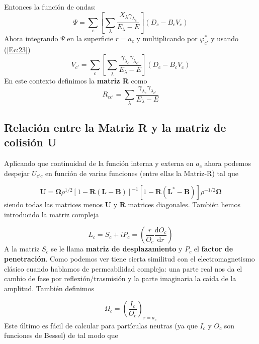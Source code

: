 \documentclass[fleqn,10pt]{SelfArx} %
\newcommand{\parentesis}[1]{\left( #1  \right)}
\newcommand{\ccorchetes}[1]{\left[ #1  \right]}
\newcommand{\D}{\mathrm{d}}
\newcommand{\derivadas}[2]{\frac{\D #1}{\D #2}}
\newcommand{\Rn}{\mathbf{R}}
\newcommand{\Ln}{\mathbf{L}}
\newcommand{\Un}{\mathbf{U}}
\newcommand{\Bn}{\mathbf{B}}
\newcommand{\Omegan}{\boldsymbol{\Omega}}
\begin{document}
Entonces la función de ondas:
\begin{equation}
	\Psi = \sum_c \ccorchetes{\sum_\lambda \frac{X_\lambda \gamma_{\lambda_c}}{E_\lambda - E}} (D_c - B_c V_c)
\end{equation}
Ahora integrando $\Psi$ en la superficie $r=a_c$ y multiplicando por $\varphi_{c'}^*$ y usando (\ref{Ec:23})
\begin{equation}
	V_{c'} = \sum_c \ccorchetes{\sum_{\lambda} \frac{\gamma_{\lambda_c} \gamma_{\lambda_{c'}}}{E_\lambda-E}} (D_c-B_cV_c)
\end{equation}
En este contexto definimos la \textbf{matriz R} como
\begin{equation}
	R_{cc'}=\sum_{\lambda} \frac{\gamma_{\lambda_c} \gamma_{\lambda_{c'}}}{E_\lambda-E}
\end{equation}

\subsection{Relación entre la Matriz R y la matriz de colisión U}

Aplicando que continuidad de la función interna y externa en $a_c$ ahora podemos despejar $U_{c'c}$ en función de varias funciones \cite{Biblia} (entre ellas la Matriz-R) tal que 

\begin{equation}
	\Un=\Omegan \rho^{1/2} [1-\Rn(\Ln-\Bn)]^{-1}[1-\Rn(\Ln^*-\Bn)]\rho^{-1/2}  \Omegan
	\label{Ec:31}
 \end{equation}
siendo todas las matrices menos $\Un$ y $\Rn$ matrices diagonales. También hemos introducido la matriz compleja

\begin{equation}
	L_c = S_c + i P_c = \parentesis{\frac{r}{O_c} \derivadas{O_c}{r}}
\end{equation}
A la matriz $S_c$ se le llama \textbf{matriz de desplazamiento} y $P_c$ el \textbf{factor de penetración}. Como podemos ver tiene cierta similitud con el electromagnetismo clásico cuando hablamos de permeabilidad compleja: una parte real nos da el cambio de fase por reflexión/trasmisión y la parte imaginaria la caída de la amplitud. También definimos

\begin{equation}
	\Omega_c = \parentesis{\frac{I_c}{O_c}}_{r=a_c}
\end{equation}
Este último es fácil de calcular para partículas neutras (ya que $I_c$ y $O_c$ son funciones de Bessel) de tal modo que 
\end{document}
